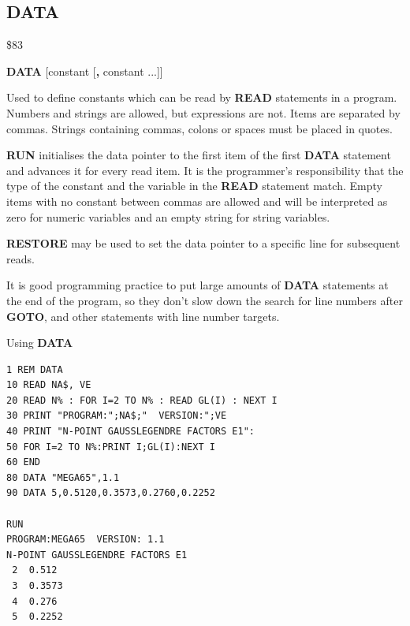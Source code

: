 
\newpage
\subsection{DATA}
\begin{description}[leftmargin=2cm,style=nextline]
\item [Token:] \$83
\item [Format:] {\bf DATA} [constant [{\bf,} constant ...]]
\item [Usage:] Used to define constants
               which can be read by {\bf READ} statements
               in a program. Numbers and strings are allowed, but expressions are not.
               Items are separated by commas.
               Strings containing commas, colons or spaces must be placed
               in quotes.

               {\bf RUN} initialises the data pointer
               to the first item of the first {\bf DATA} statement
               and advances it for every read item. It is the
               programmer's responsibility that the type of
               the constant and the variable in the {\bf READ}
               statement match. Empty items with no constant
               between commas are allowed and will be interpreted as
               zero for numeric variables and an empty string for
               string variables.

               {\bf RESTORE} may be used to set the
               data pointer to a specific line for subsequent
               reads.

\item [Remarks:] It is good programming practice to put large amounts of
               {\bf DATA} statements at the end of the program,
               so they don't slow down the search for line numbers
               after {\bf GOTO}, and other statements with line number targets.
\item [Example:] Using {\bf DATA}
\begin{tcolorbox}[colback=black,coltext=white]
\verbatimfont{\codefont}
\begin{verbatim}
1 REM DATA
10 READ NA$, VE
20 READ N% : FOR I=2 TO N% : READ GL(I) : NEXT I
30 PRINT "PROGRAM:";NA$;"  VERSION:";VE
40 PRINT "N-POINT GAUSSLEGENDRE FACTORS E1":
50 FOR I=2 TO N%:PRINT I;GL(I):NEXT I
60 END
80 DATA "MEGA65",1.1
90 DATA 5,0.5120,0.3573,0.2760,0.2252

RUN
PROGRAM:MEGA65  VERSION: 1.1
N-POINT GAUSSLEGENDRE FACTORS E1
 2  0.512
 3  0.3573
 4  0.276
 5  0.2252
\end{verbatim}
\end{tcolorbox}
\end{description}

